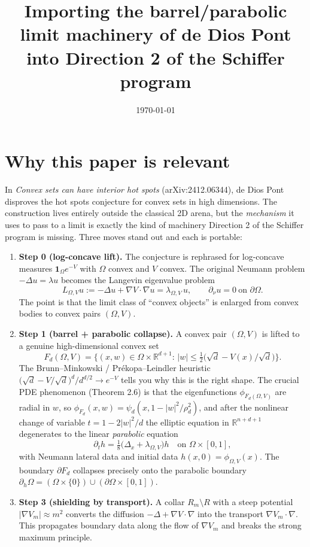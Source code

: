 \documentclass[11pt]{article}
\title{Importing the barrel/parabolic limit machinery of de Dios Pont
into Direction 2 of the Schiffer program}
\author{}
\date{\today}
\newcommand{\R}{\mathbb{R}}
\newcommand{\Om}{\Omega}
\newcommand{\1}{\mathbf 1}
\begin{document}
\maketitle

\section*{Why this paper is relevant}

In \emph{Convex sets can have interior hot spots} (arXiv:2412.06344), de
Dios Pont disproves the hot spots conjecture for convex sets in high
dimensions. The construction lives entirely outside the classical
2D arena, but the \emph{mechanism} it uses to pass to a limit is exactly
the kind of machinery Direction 2 of the Schiffer program is missing.
Three moves stand out and each is portable:

\begin{enumerate}[leftmargin=*]
    \item \textbf{Step 0 (log-concave lift).} The conjecture is rephrased
    for log-concave measures $\1_\Om e^{-V}$ with $\Om$ convex and $V$
    convex. The original Neumann problem $-\Delta u=\lambda u$ becomes
    the Langevin eigenvalue problem
    \[
        L_{\Om,V}u := -\Delta u+\nabla V\cdot\nabla u=\lambda_{\Om,V}\,u,
        \qquad \partial_\nu u=0\ \text{on }\partial\Om.
    \]
    The point is that the limit class of ``convex objects'' is enlarged
    from convex bodies to convex pairs $(\Om,V)$.

    \item \textbf{Step 1 (barrel + parabolic collapse).} A convex pair
    $(\Om,V)$ is lifted to a genuine high-dimensional convex set
    \[
        F_d(\Om,V)=\bigl\{(x,w)\in\Om\times\R^{d+1}:\,
            |w|\le\tfrac{1}{2}\bigl(\sqrt d-V(x)/\sqrt d\bigr)\bigr\}.
    \]
    The Brunn--Minkowski / Pr\'ekopa--Leindler heuristic
    $\bigl(\sqrt d-V/\sqrt d\bigr)^d/d^{d/2}\to e^{-V}$ tells you why
    this is the right shape. The crucial PDE phenomenon (Theorem 2.6)
    is that the eigenfunctions $\phi_{F_d(\Om,V)}$ are radial in $w$,
    so $\phi_{F_d}(x,w)=\psi_d(x,1-|w|^2/\rho_d^2)$, and after the
    nonlinear change of variable $t=1-2|w|^2/d$ the elliptic equation
    in $\R^{n+d+1}$ degenerates to the linear \emph{parabolic} equation
    \[
        \partial_t h=\tfrac{1}{8}\bigl(\Delta_x+\lambda_{\Om,V}\bigr)h
        \quad\text{on }\Om\times[0,1],
    \]
    with Neumann lateral data and initial data $h(x,0)=\phi_{\Om,V}(x)$.
    The boundary $\partial F_d$ collapses precisely onto the parabolic
    boundary $\partial_h\Om=(\Om\times\{0\})\cup(\partial\Om\times[0,1])$.

    \item \textbf{Step 3 (shielding by transport).} A collar
    $R_m\setminus R$ with a steep potential $|\nabla V_m|\approx m^2$
    converts the diffusion $-\Delta+\nabla V\cdot\nabla$ into the
    transport $\nabla V_m\cdot\nabla$. This propagates boundary data
    along the flow of $\nabla V_m$ and breaks the strong maximum
    principle.
\end{enumerate}
\end{document}
